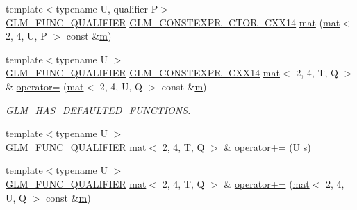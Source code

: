 \begin{DoxyCompactItemize}
\item 
{\footnotesize template$<$typename U, qualifier P$>$ }\\\hyperlink{setup_8hpp_a33fdea6f91c5f834105f7415e2a64407}{G\+L\+M\+\_\+\+F\+U\+N\+C\+\_\+\+Q\+U\+A\+L\+I\+F\+I\+ER} \hyperlink{setup_8hpp_a0900f9145e68bf6061b6f5e7be3fa751}{G\+L\+M\+\_\+\+C\+O\+N\+S\+T\+E\+X\+P\+R\+\_\+\+C\+T\+O\+R\+\_\+\+C\+X\+X14} \hyperlink{structglm_1_1mat_3_012_00_014_00_01_t_00_01_q_01_4_a0fba6a2c0edf428cb93057e2eca9f7ad}{mat} (\hyperlink{structglm_1_1mat}{mat}$<$ 2, 4, U, P $>$ const \&\hyperlink{_s_d_l__opengl__glext_8h_af593500c283bf1a787a6f947f503a5c2}{m})
\item 
{\footnotesize template$<$typename U $>$ }\\\hyperlink{setup_8hpp_a33fdea6f91c5f834105f7415e2a64407}{G\+L\+M\+\_\+\+F\+U\+N\+C\+\_\+\+Q\+U\+A\+L\+I\+F\+I\+ER} \hyperlink{setup_8hpp_a4dd12abf5e1164bc57f3a34671d03844}{G\+L\+M\+\_\+\+C\+O\+N\+S\+T\+E\+X\+P\+R\+\_\+\+C\+X\+X14} \hyperlink{structglm_1_1mat}{mat}$<$ 2, 4, T, Q $>$ \& \hyperlink{structglm_1_1mat_3_012_00_014_00_01_t_00_01_q_01_4_a19be71908044d2aa85169d495b738c8f}{operator=} (\hyperlink{structglm_1_1mat}{mat}$<$ 2, 4, U, Q $>$ const \&\hyperlink{_s_d_l__opengl__glext_8h_af593500c283bf1a787a6f947f503a5c2}{m})
\begin{DoxyCompactList}\small\item\em G\+L\+M\+\_\+\+H\+A\+S\+\_\+\+D\+E\+F\+A\+U\+L\+T\+E\+D\+\_\+\+F\+U\+N\+C\+T\+I\+O\+NS. \end{DoxyCompactList}\item 
{\footnotesize template$<$typename U $>$ }\\\hyperlink{setup_8hpp_a33fdea6f91c5f834105f7415e2a64407}{G\+L\+M\+\_\+\+F\+U\+N\+C\+\_\+\+Q\+U\+A\+L\+I\+F\+I\+ER} \hyperlink{structglm_1_1mat}{mat}$<$ 2, 4, T, Q $>$ \& \hyperlink{structglm_1_1mat_3_012_00_014_00_01_t_00_01_q_01_4_a2a7667a3e13a109fc7feef253654b9a7}{operator+=} (U \hyperlink{_s_d_l__opengl_8h_a4af680a6c683f88ed67b76f207f2e6e4}{s})
\item 
{\footnotesize template$<$typename U $>$ }\\\hyperlink{setup_8hpp_a33fdea6f91c5f834105f7415e2a64407}{G\+L\+M\+\_\+\+F\+U\+N\+C\+\_\+\+Q\+U\+A\+L\+I\+F\+I\+ER} \hyperlink{structglm_1_1mat}{mat}$<$ 2, 4, T, Q $>$ \& \hyperlink{structglm_1_1mat_3_012_00_014_00_01_t_00_01_q_01_4_a44465daad3626301801fa9ebcf9f07d0}{operator+=} (\hyperlink{structglm_1_1mat}{mat}$<$ 2, 4, U, Q $>$ const \&\hyperlink{_s_d_l__opengl__glext_8h_af593500c283bf1a787a6f947f503a5c2}{m})
\item 

\end{DoxyCompactItemize}
